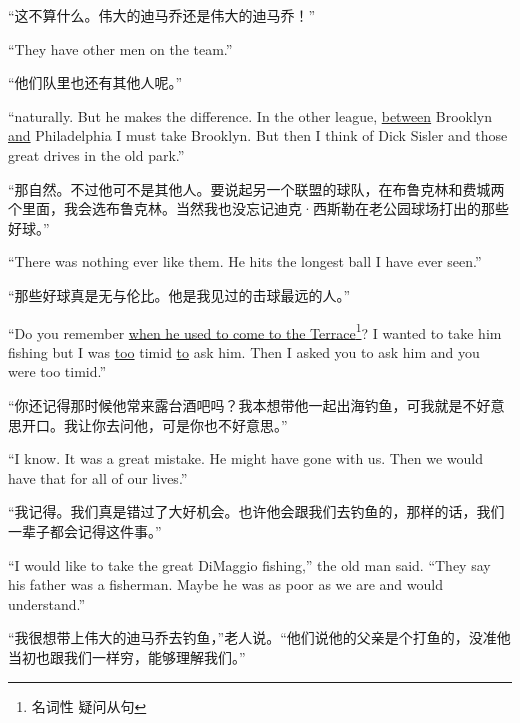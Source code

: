 \begin{paracol}{2}
“这不算什么。伟大的迪马乔还是伟大的迪马乔！”

\switchcolumn*

``They have other men on the team.''

\switchcolumn

“他们队里也还有其他人呢。”

\switchcolumn*

``\Gls{naturally}. But he makes the difference. In the other league,
\uline{between} Brooklyn \uline{and} Philadelphia I must take Brooklyn. But
then I think of Dick Sisler and those great drives in the old park.''

\switchcolumn

“那自然。不过他可不是其他人。要说起另一个联盟的球队，在布鲁克林和费城两个里面，我会选布鲁克林。当然我也没忘记迪克·西斯勒在老公园球场打出的那些好球。”

\switchcolumn*

``There was nothing ever like them. He hits the longest ball I have ever seen.''

\switchcolumn

“那些好球真是无与伦比。他是我见过的击球最远的人。”

\switchcolumn*

``Do you remember \uline{when he used to come to the Terrace}\footnote{名词性
  疑问从句}? I wanted to take him fishing but I was \uline{too} \gls{timid}
\uline{to} ask him. Then I asked you to ask him and you were too timid.''

\switchcolumn

“你还记得那时候他常来露台酒吧吗？我本想带他一起出海钓鱼，可我就是不好意思开口。我让你去问他，可是你也不好意思。”

\switchcolumn*

``I know. It was a great \gls{mistake}. He might have gone with us. Then we
would have that for all of our lives.''

\switchcolumn

“我记得。我们真是错过了大好机会。也许他会跟我们去钓鱼的，那样的话，我们一辈子都会记得这件事。”

\switchcolumn*

``I would like to take the great DiMaggio fishing,'' the old man said.
``They say his father was a fisherman. Maybe he was as poor as we are and
would understand.''

\switchcolumn

“我很想带上伟大的迪马乔去钓鱼，”老人说。“他们说他的父亲是个打鱼的，没准他当初也跟我们一样穷，能够理解我们。”


\end{paracol}
